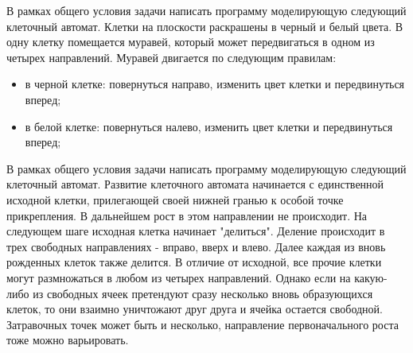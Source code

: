 \begin{zztask}
В рамках общего условия задачи написать программу моделирующую следующий 
клеточный автомат. Клетки на плоскости раскрашены в черный и белый цвета.
В одну клетку помещается муравей, который может передвигаться в одном из четырех 
направлений. Муравей двигается по следующим правилам:
\begin{itemize}
	\item в черной клетке: повернуться направо, изменить цвет клетки и передвинуться
	      вперед;
	\item в белой клетке: повернуться налево, изменить цвет клетки и передвинуться
	      вперед;
\end{itemize}
\end{zztask}

\begin{zztask}[Лист]
В рамках общего условия задачи написать программу моделирующую следующий 
клеточный автомат.
Развитие клеточного автомата начинается с единственной исходной клетки, 
прилегающей своей нижней гранью к особой точке прикрепления. В дальнейшем 
рост в этом направлении не происходит. На следующем шаге исходная клетка 
начинает "делиться". Деление происходит в трех свободных направлениях - 
вправо, вверх и влево. Далее каждая из вновь рожденных клеток также делится. 
В отличие от исходной, все прочие клетки могут размножаться в любом из 
четырех направлений. Однако если на какую-либо из свободных ячеек претендуют 
сразу несколько вновь образующихся клеток, то они взаимно уничтожают друг 
друга и ячейка остается свободной. Затравочных точек может быть и несколько, 
направление первоначального роста тоже можно варьировать.
\end{zztask}

